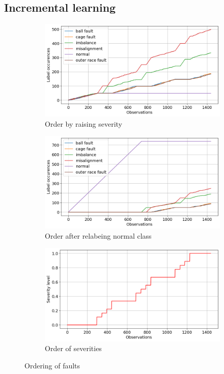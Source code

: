 \subsection{Incremental learning}
\begin{figure}[ht]
    \centering
    \begin{subfigure}[b]{0.3\textwidth}
        \includegraphics[width=\textwidth]{assets/results/incremental-learning/order-natural.png}
        \caption{Order by raising severity}
    \end{subfigure}
    \hfill
    \begin{subfigure}[b]{0.3\textwidth}
        \includegraphics[width=\textwidth]{assets/results/incremental-learning/order-severity.png}
        \caption{Order after relabeing normal class}
    \end{subfigure}
    \hfill
    \begin{subfigure}[b]{0.3\textwidth}
        \includegraphics[width=\textwidth]{assets/results/incremental-learning/severity-levels.png}
        \caption{Order of severities}
    \end{subfigure}
    \caption{Ordering of faults}
\end{figure}

